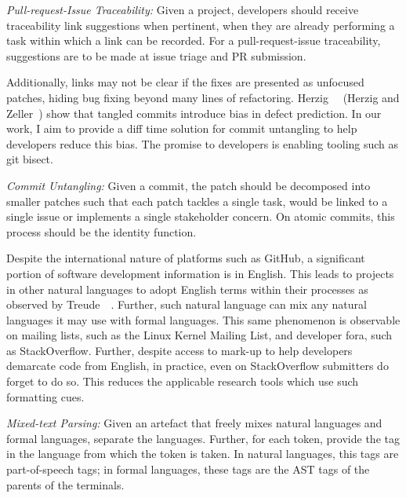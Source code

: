 \begin{tcolorbox}
    \emph{Pull-request-Issue Traceability:} Given a project, developers should
    receive traceability link suggestions when pertinent, \ie when they are
    already performing a task within which a link can be recorded. For a
    pull-request-issue traceability, suggestions are to be made at issue triage
    and PR submission.
\end{tcolorbox}

Additionally, links may not be clear if the fixes are presented as unfocused
patches, hiding bug fixing beyond many lines of refactoring.
Herzig~\etal~\cite{Herzig2016} (Herzig and Zeller~\cite{Herzig2013}) show that
tangled commits introduce bias in defect prediction. In our work, I aim to
provide a diff time solution for commit untangling to help developers reduce
this bias. The promise to developers is enabling tooling such as git bisect.

\begin{tcolorbox}
    \emph{Commit Untangling:} Given a commit, the patch should be decomposed
    into smaller patches such that each patch tackles a single task, \ie would
    be linked to a single issue or implements a single stakeholder concern. On
    atomic commits, this process should be the identity function.
\end{tcolorbox}

Despite the international nature of platforms such as GitHub, a significant
portion of software development information is in English. This leads to
projects in other natural languages to adopt English terms within their
processes as observed by Treude~\etal~\cite{Treude2015portuguese}. Further, such
natural language can mix any natural languages it may use with formal languages.
This same phenomenon is observable on mailing lists, such as the Linux Kernel
Mailing List, and developer fora, such as StackOverflow.  Further, despite
access to mark-up to help developers demarcate code from English, in practice,
even on StackOverflow submitters do forget to do so. This reduces the applicable
research tools which use such formatting cues.

\begin{tcolorbox}
    \emph{Mixed-text Parsing:} Given an artefact that freely
    mixes natural languages and formal languages, separate the languages.
    Further, for each token, provide the tag in the language from which the
    token is taken. In natural languages, this tags are part-of-speech tags; in
    formal languages, these tags are the AST tags of the parents of the
    terminals.
\end{tcolorbox}

